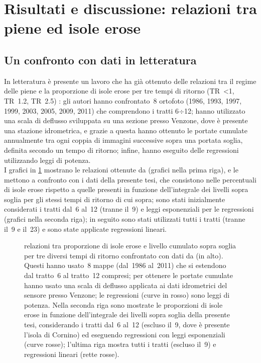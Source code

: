 \section{Risultati e discussione: relazioni tra piene ed isole erose}
\subsection{Un confronto con dati in letteratura}
In letteratura è presente un lavoro che ha già ottenuto delle relazioni tra il regime delle piene e la proporzione di isole erose per tre tempi di ritorno (TR~\SI{<1}{\anno}, TR~\SI{1.2}{\anni}, TR~\SI{2.5}{\anni}) :
gli autori hanno confrontato~8 ortofoto (1986, 1993, 1997, 1999, 2003, 2005, 2009, 2011) che comprendono i tratti 6$\div$12;
hanno utilizzato una scala di deflusso sviluppata su una sezione presso Venzone, dove è presente una stazione idrometrica, e grazie a questa hanno ottenuto le portate cumulate annualmente tra ogni coppia di immagini successive sopra una portata soglia, definita secondo un tempo di ritorno;
infine, hanno eseguito delle regressioni utilizzando leggi di potenza.
\\
I grafici in \cref{graph:relazioni-piene-erosione-vs-surian} mostrano le relazioni ottenute da  (grafici nella prima riga), e le mettono a confronto con i dati della presente tesi, che consistono nelle percentuali di isole erose rispetto a quelle presenti in funzione dell'integrale dei livelli sopra soglia per gli stessi tempi di ritorno di cui sopra; sono stati inizialmente considerati i tratti dal~6 al~12 (tranne il~9) e leggi esponenziali per le regressioni (grafici nella seconda riga); in seguito sono stati utilizzati tutti i tratti (tranne il~9 e il~23) e sono state applicate regressioni lineari.
%
\begin{figure}
	\centering
	
	\vspace*{-0.7cm}
	\caption[relazioni tra proporzione di isole erose e livello cumulato sopra soglia, confrontato con dati da ]{relazioni tra proporzione di isole erose e livello cumulato sopra soglia per tre diversi tempi di ritorno confrontato con dati da  (in alto).
	Questi hanno usato~8 mappe (dal~1986 al~2011) che si estendono dal tratto~6 al tratto~12 compresi; per ottenere le portate cumulate hanno usato una scala di deflusso applicata ai dati idrometrici del sensore presso Venzone; le regressioni (curve in rosso) sono leggi di potenza.
	Nella seconda riga sono mostrate le proporzioni di isole erose in funzione dell'integrale dei livelli sopra soglia della presente tesi, considerando i tratti dal~6 al~12 (escluso il~9, dove è presente l'isola di Cornino) ed eseguendo regressioni con leggi esponenziali (curve rosse); l'ultima riga mostra tutti i tratti (escluso il~9) e regressioni lineari (rette rosse).}
	\label{graph:relazioni-piene-erosione-vs-surian}
\end{figure}
